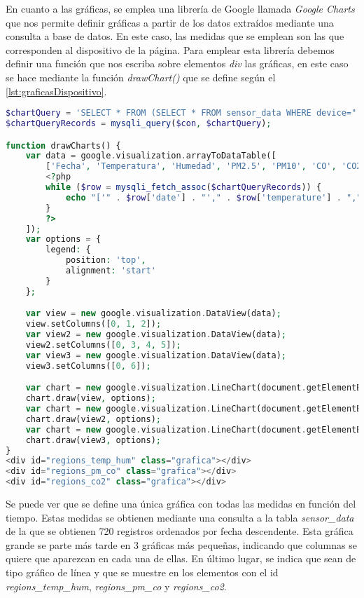 En cuanto a las gráficas, se emplea una librería de Google llamada \textit{Google Charts} que nos permite definir gráficas a partir de los datos extraídos mediante una consulta a base de datos. En este caso, las medidas que se emplean son las que corresponden al dispositivo de la página. Para emplear esta librería debemos definir una función que nos escriba sobre elementos \textit{div} las gráficas, en este caso se hace mediante la función \textit{drawChart()} que se define según el \autoref{lst:graficasDispositivo}.
\begin{lstlisting}[language=PHP, caption=Graficas de las medidas del dispositivo, label=lst:graficasDispositivo]
$chartQuery = 'SELECT * FROM (SELECT * FROM sensor_data WHERE device="' . $_GET["id"] . '" ORDER BY date DESC LIMIT 720) sub ORDER BY date ASC';
$chartQueryRecords = mysqli_query($con, $chartQuery);

function drawCharts() {
    var data = google.visualization.arrayToDataTable([
        ['Fecha', 'Temperatura', 'Humedad', 'PM2.5', 'PM10', 'CO', 'CO2'],
        <?php
        while ($row = mysqli_fetch_assoc($chartQueryRecords)) {
            echo "['" . $row['date'] . "'," . $row['temperature'] . "," . $row['humidity'] . "," . $row['pm2_5'] . "," . $row['pm10'] . "," . $row['co'] . "," . $row['co2'] . "],";
        }
        ?>
    ]);
    var options = {
        legend: {
            position: 'top',
            alignment: 'start'
        }
    };

    var view = new google.visualization.DataView(data);
    view.setColumns([0, 1, 2]);
    var view2 = new google.visualization.DataView(data);
    view2.setColumns([0, 3, 4, 5]);
    var view3 = new google.visualization.DataView(data);
    view3.setColumns([0, 6]);

    var chart = new google.visualization.LineChart(document.getElementById('regions_temp_hum'));
    chart.draw(view, options);
    var chart = new google.visualization.LineChart(document.getElementById('regions_pm_co'));
    chart.draw(view2, options);
    var chart = new google.visualization.LineChart(document.getElementById('regions_co2'));
    chart.draw(view3, options);
}
<div id="regions_temp_hum" class="grafica"></div>
<div id="regions_pm_co" class="grafica"></div>
<div id="regions_co2" class="grafica"></div>
\end{lstlisting}

Se puede ver que se define una única gráfica con todas las medidas en función del tiempo. Estas medidas se obtienen mediante una consulta a la tabla \textit{sensor\_data} de la que se obtienen 720 registros ordenados por fecha descendente. Esta gráfica grande se parte más tarde en 3 gráficas más pequeñas, indicando que columnas se quiere que aparezcan en cada una de ellas. En último lugar, se indica que sean de tipo gráfico de línea y que se muestre en los elementos con el id \textit{regions\_temp\_hum}, \textit{regions\_pm\_co} y \textit{regions\_co2}.


